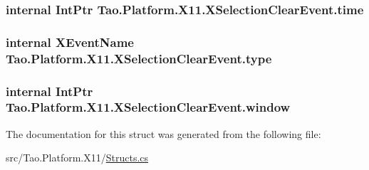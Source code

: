 \label{struct_tao_1_1_platform_1_1_x11_1_1_x_selection_clear_event_a7a94502562ab689728d12ceabce7e934}
\hypertarget{struct_tao_1_1_platform_1_1_x11_1_1_x_selection_clear_event_a46ac45adcdb8f78af3f01676c3c17ebe}{
\subsubsection[{time}]{\setlength{\rightskip}{0pt plus 5cm}internal IntPtr {\bf Tao.Platform.X11.XSelectionClearEvent.time}}}
\label{struct_tao_1_1_platform_1_1_x11_1_1_x_selection_clear_event_a46ac45adcdb8f78af3f01676c3c17ebe}
\hypertarget{struct_tao_1_1_platform_1_1_x11_1_1_x_selection_clear_event_a9c2d815b92d58200ecc397a1033da40b}{
\subsubsection[{type}]{\setlength{\rightskip}{0pt plus 5cm}internal {\bf XEventName} {\bf Tao.Platform.X11.XSelectionClearEvent.type}}}
\label{struct_tao_1_1_platform_1_1_x11_1_1_x_selection_clear_event_a9c2d815b92d58200ecc397a1033da40b}
\hypertarget{struct_tao_1_1_platform_1_1_x11_1_1_x_selection_clear_event_a171e3ba5de9c3f9667b9946ab523ea2a}{
\subsubsection[{window}]{\setlength{\rightskip}{0pt plus 5cm}internal IntPtr {\bf Tao.Platform.X11.XSelectionClearEvent.window}}}
\label{struct_tao_1_1_platform_1_1_x11_1_1_x_selection_clear_event_a171e3ba5de9c3f9667b9946ab523ea2a}


The documentation for this struct was generated from the following file:\begin{DoxyCompactItemize}
\item 
src/Tao.Platform.X11/\hyperlink{_structs_8cs}{Structs.cs}\end{DoxyCompactItemize}
